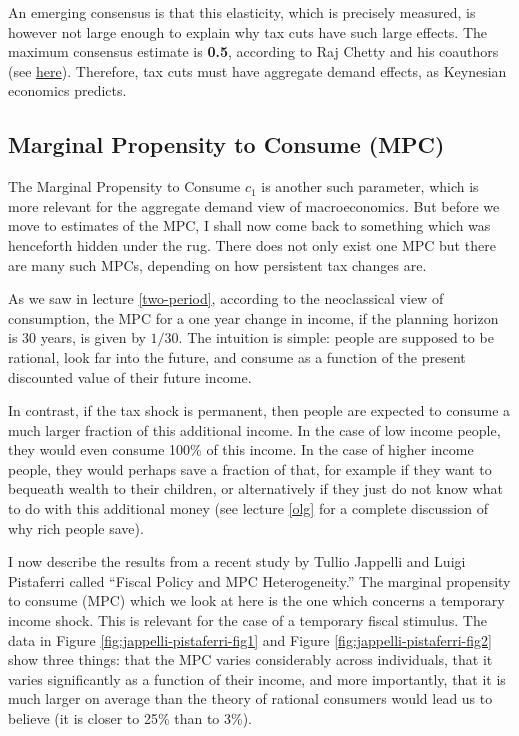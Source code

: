 \documentclass[]{book}
\begin{document}
An emerging consensus is that this elasticity, which is precisely
measured, is however not large enough to explain why tax cuts have such
large effects. The maximum consensus estimate is \textbf{0.5}, according
to Raj Chetty and his coauthors (see
\href{https://doi.org/10.1257/aer.101.3.471}{here}). Therefore, tax cuts
must have aggregate demand effects, as Keynesian economics predicts.

\subsection{Marginal Propensity to Consume
(MPC)}\label{marginal-propensity-to-consume-mpc}

The Marginal Propensity to Consume \(c_1\) is another such parameter,
which is more relevant for the aggregate demand view of macroeconomics.
But before we move to estimates of the MPC, I shall now come back to
something which was henceforth hidden under the rug. There does not only
exist one MPC but there are many such MPCs, depending on how persistent
tax changes are.

As we saw in lecture \ref{two-period}, according to the neoclassical
view of consumption, the MPC for a one year change in income, if the
planning horizon is 30 years, is given by \(1/30\). The intuition is
simple: people are supposed to be rational, look far into the future,
and consume as a function of the present discounted value of their
future income.

In contrast, if the tax shock is permanent, then people are expected to
consume a much larger fraction of this additional income. In the case of
low income people, they would even consume 100\% of this income. In the
case of higher income people, they would perhaps save a fraction of
that, for example if they want to bequeath wealth to their children, or
alternatively if they just do not know what to do with this additional
money (see lecture \ref{olg} for a complete discussion of why rich
people save).

I now describe the results from a recent study by Tullio Jappelli and
Luigi Pistaferri called ``Fiscal Policy and MPC Heterogeneity.'' The
marginal propensity to consume (MPC) which we look at here is the one
which concerns a temporary income shock. This is relevant for the case
of a temporary fiscal stimulus. The data in Figure
\ref{fig:jappelli-pistaferri-fig1} and Figure
\ref{fig:jappelli-pistaferri-fig2} show three things: that the MPC
varies considerably across individuals, that it varies significantly as
a function of their income, and more importantly, that it is much larger
on average than the theory of rational consumers would lead us to
believe (it is closer to 25\% than to 3\%).
\end{document}

